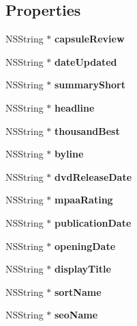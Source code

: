 \subsection*{Properties}
\begin{DoxyCompactItemize}
\item 
N\+S\+String $\ast$ {\bfseries capsule\+Review}\label{interface_results_a8f88258e942d8754be5c1c4c2748e750}

\item 
N\+S\+String $\ast$ {\bfseries date\+Updated}\label{interface_results_a9487291291515c0f5b159466d8a52c6e}

\item 
N\+S\+String $\ast$ {\bfseries summary\+Short}\label{interface_results_ab9dfb48a96eca94207d3aafa39494979}

\item 
N\+S\+String $\ast$ {\bfseries headline}\label{interface_results_aa9d5b737d97fb9de6eab64f77fa0906e}

\item 
N\+S\+String $\ast$ {\bfseries thousand\+Best}\label{interface_results_ae0e25322f7ee80b006276a042261ae49}

\item 
N\+S\+String $\ast$ {\bfseries byline}\label{interface_results_a0b79ebbdb1b08e1e44b6f30c0a90221d}

\item 
N\+S\+String $\ast$ {\bfseries dvd\+Release\+Date}\label{interface_results_aaba2fa54074c34cf914c1825a8006ce1}

\item 
N\+S\+String $\ast$ {\bfseries mpaa\+Rating}\label{interface_results_ad323323b4e1ae17188cdc621d9deb327}

\item 
N\+S\+String $\ast$ {\bfseries publication\+Date}\label{interface_results_a861513e476e89e338838076e94f5b6a1}

\item 
N\+S\+String $\ast$ {\bfseries opening\+Date}\label{interface_results_a9c4f779e8e08cf63a7fb6fbe5ae8723c}

\item 
N\+S\+String $\ast$ {\bfseries display\+Title}\label{interface_results_ad002b427b03b09001fd1ce92b93a4b36}

\item 
N\+S\+String $\ast$ {\bfseries sort\+Name}\label{interface_results_abcb7419e64437a1860cd1a843650a8a3}

\item 
N\+S\+String $\ast$ {\bfseries seo\+Name}\label{interface_results_a8518012a8b4de7ff4731cd39d03711fa}


\end{DoxyCompactItemize}
